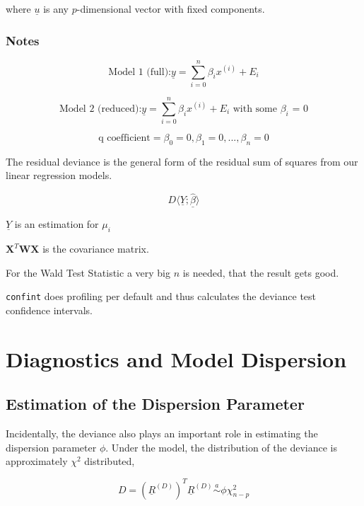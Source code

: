 \documentclass[11pt]{article}
\begin{document}
where $\underline{u}$ is any $p$-dimensional vector with fixed components.

\subsubsection{Notes}

\begin{equation*}
	\text{Model 1 (full):} \underline{y} = \sum_{i=0}^{n} \beta_i x^{(i)} + E_i
\end{equation*}

\begin{equation*}
	\text{Model 2 (reduced):} \underline{y} = \sum_{i=0}^{n} \beta_i x^{(i)} + E_i \text{ with some $\beta_i$ = 0}
\end{equation*}

\begin{equation*}
	\text{q coefficient} = \beta_0 = 0, \beta_1 = 0, ..., \beta_n = 0
\end{equation*}

\noindent
The residual deviance is the general form of the residual sum of squares from our linear regression models.

\begin{equation*}
	D\langle \underline{Y};\underline{\widehat{\beta}} \rangle 
\end{equation*}

$\underline{Y}$ is an estimation for $\mu_i$

$\textbf{X}^T\textbf{W}\textbf{X}$ is the covariance matrix.

For the Wald Test Statistic a very big $n$ is needed, that the result gets good.

\texttt{confint} does profiling per default and thus calculates the deviance test confidence intervals.

\section{Diagnostics and Model Dispersion}

\subsection{Estimation of the Dispersion Parameter}
Incidentally, the deviance also plays an important role in estimating the dispersion parameter $\phi$. Under the model, the distribution of the deviance is approximately $\chi^2$ distributed,

\begin{equation*}
	D = (\underline{R}^{(D)})^T\underline{R}^{(D)} \overset{a}{\sim} \phi\chi_{n-p}^2
\end{equation*}
\end{document}
